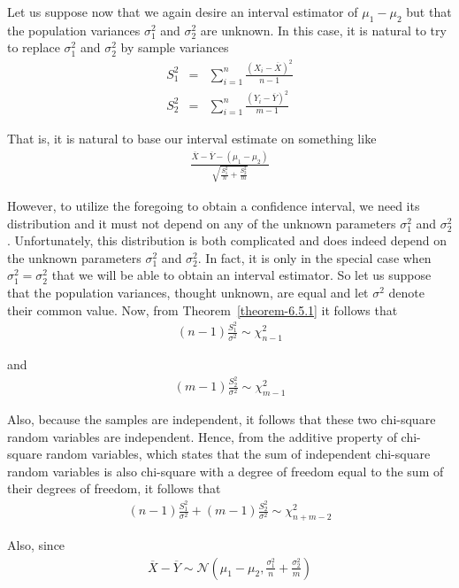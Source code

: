 \documentclass[12pt]{article}
\begin{document}
Let us suppose now that we again desire an interval estimator of $\mu_1 - \mu_2$ but that the population variances $\sigma_1^2$ and $\sigma_2^2$ are unknown. In this case, it is natural to try to replace $\sigma_1^2$ and $\sigma_2^2$ by sample variances
\begin{eqnarray*}
  S_1^2 &=& \sum_{i=1}^n \frac {(X_i - \overline{X})^2}{n-1} \\
  S_2^2 &=& \sum_{i=1}^n \frac {(Y_i - \overline{Y})^2}{m-1}
\end{eqnarray*}

That is, it is natural to base our interval estimate on something like
\begin{eqnarray*}
  \frac {\overline{X} - \overline{Y} - (\mu_1 - \mu_2)}
  {\sqrt {\frac{S_1^2}{n} + \frac{S_2^2}{m}}}
\end{eqnarray*}

However, to utilize the foregoing to obtain a confidence interval, we need its distribution and it must not depend on any of the unknown parameters $\sigma_1^2$ and $\sigma_2^2$. Unfortunately, this distribution is both complicated and does indeed depend on the unknown parameters $\sigma_1^2$ and $\sigma_2^2$. In fact, it is only in the special case when $\sigma_1^2 = \sigma_2^2$ that we will be able to obtain an interval estimator. So let us suppose that the population variances, thought unknown, are equal and let $\sigma^2$ denote their common value. Now, from Theorem~\ref{theorem-6.5.1} it follows that
\begin{eqnarray*}
  (n-1) \frac {S_1^2}{\sigma^2} \sim \chi_{n-1}^2
\end{eqnarray*}

and
\begin{eqnarray*}
  (m-1) \frac {S_2^2}{\sigma^2} \sim \chi_{m-1}^2
\end{eqnarray*}

Also, because the samples are independent, it follows that these two chi-square random variables are independent. Hence, from the additive property of chi-square random variables, which states that the sum of independent chi-square random variables is also chi-square with a degree of freedom equal to the sum of their degrees of freedom, it follows that
\begin{eqnarray*}
    (n-1) \frac {S_1^2}{\sigma^2} + (m-1) \frac {S_2^2}{\sigma^2}
    \sim \chi_{n+m-2}^2
\end{eqnarray*}

Also, since
\begin{eqnarray*}
  \overline{X} - \overline{Y} \sim \mathcal{N} (\mu_1 - \mu_2,
  \frac{\sigma_1^2}{n} + \frac{\sigma_2^2}{m})
\end{eqnarray*}
\end{document}
